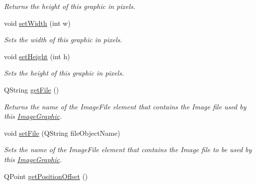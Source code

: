 \begin{DoxyCompactItemize}
\begin{DoxyCompactList}\small\item\em Returns the height of this graphic in pixels. \end{DoxyCompactList}\item 
\hypertarget{class_picto_1_1_image_graphic_aa8c7e5ed97954f7bb5017ba6b88d21b4}{void \hyperlink{class_picto_1_1_image_graphic_aa8c7e5ed97954f7bb5017ba6b88d21b4}{set\-Width} (int w)}\label{class_picto_1_1_image_graphic_aa8c7e5ed97954f7bb5017ba6b88d21b4}

\begin{DoxyCompactList}\small\item\em Sets the width of this graphic in pixels. \end{DoxyCompactList}\item 
\hypertarget{class_picto_1_1_image_graphic_ad578c5351eac0ec637b5bf2ced5f59b3}{void \hyperlink{class_picto_1_1_image_graphic_ad578c5351eac0ec637b5bf2ced5f59b3}{set\-Height} (int h)}\label{class_picto_1_1_image_graphic_ad578c5351eac0ec637b5bf2ced5f59b3}

\begin{DoxyCompactList}\small\item\em Sets the height of this graphic in pixels. \end{DoxyCompactList}\item 
\hypertarget{class_picto_1_1_image_graphic_a20e1b553cb9d8c36c398e01f4686010d}{Q\-String \hyperlink{class_picto_1_1_image_graphic_a20e1b553cb9d8c36c398e01f4686010d}{get\-File} ()}\label{class_picto_1_1_image_graphic_a20e1b553cb9d8c36c398e01f4686010d}

\begin{DoxyCompactList}\small\item\em Returns the name of the Image\-File element that contains the Image file used by this \hyperlink{class_picto_1_1_image_graphic}{Image\-Graphic}. \end{DoxyCompactList}\item 
\hypertarget{class_picto_1_1_image_graphic_a851b791ea2f9c5aa8a85177248bcdc95}{void \hyperlink{class_picto_1_1_image_graphic_a851b791ea2f9c5aa8a85177248bcdc95}{set\-File} (Q\-String file\-Object\-Name)}\label{class_picto_1_1_image_graphic_a851b791ea2f9c5aa8a85177248bcdc95}

\begin{DoxyCompactList}\small\item\em Sets the name of the Image\-File element that contains the Image file to be used by this \hyperlink{class_picto_1_1_image_graphic}{Image\-Graphic}. \end{DoxyCompactList}\item 
\hypertarget{class_picto_1_1_image_graphic_a1013da92c87614ebea63df77fdf2873d}{Q\-Point \hyperlink{class_picto_1_1_image_graphic_a1013da92c87614ebea63df77fdf2873d}{get\-Position\-Offset} ()}\label{class_picto_1_1_image_graphic_a1013da92c87614ebea63df77fdf2873d}


\end{DoxyCompactItemize}
